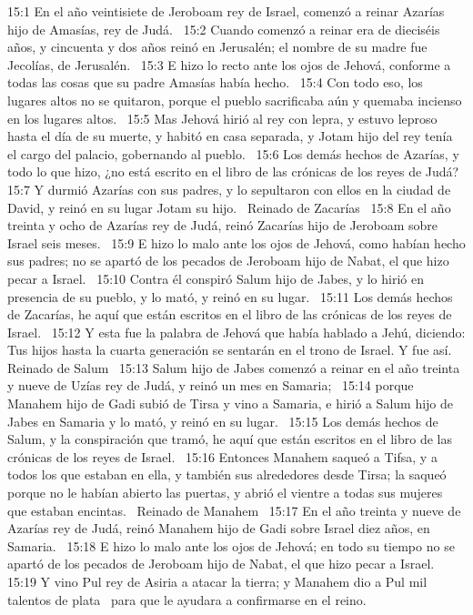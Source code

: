 15:1 En el año veintisiete de Jeroboam rey de Israel, comenzó a reinar Azarías hijo de Amasías, rey de Judá.  
15:2 Cuando comenzó a reinar era de dieciséis años, y cincuenta y dos años reinó en Jerusalén; el nombre de su madre fue Jecolías, de Jerusalén.  
15:3 E hizo lo recto ante los ojos de Jehová, conforme a todas las cosas que su padre Amasías había hecho.  
15:4 Con todo eso, los lugares altos no se quitaron, porque el pueblo sacrificaba aún y quemaba incienso en los lugares altos.  
15:5 Mas Jehová hirió al rey con lepra, y estuvo leproso hasta el día de su muerte, y habitó en casa separada, y Jotam hijo del rey tenía el cargo del palacio, gobernando al pueblo.  
15:6 Los demás hechos de Azarías, y todo lo que hizo, ¿no está escrito en el libro de las crónicas de los reyes de Judá?  
15:7 Y durmió Azarías con sus padres, y lo sepultaron con ellos en la ciudad de David, y reinó en su lugar Jotam su hijo.  
Reinado de Zacarías  
15:8 En el año treinta y ocho de Azarías rey de Judá, reinó Zacarías hijo de Jeroboam sobre Israel seis meses.  
15:9 E hizo lo malo ante los ojos de Jehová, como habían hecho sus padres; no se apartó de los pecados de Jeroboam hijo de Nabat, el que hizo pecar a Israel.  
15:10 Contra él conspiró Salum hijo de Jabes, y lo hirió en presencia de su pueblo, y lo mató, y reinó en su lugar.  
15:11 Los demás hechos de Zacarías, he aquí que están escritos en el libro de las crónicas de los reyes de Israel.  
15:12 Y esta fue la palabra de Jehová que había hablado a Jehú, diciendo: Tus hijos hasta la cuarta generación se sentarán en el trono de Israel. Y fue así.  
Reinado de Salum  
15:13 Salum hijo de Jabes comenzó a reinar en el año treinta y nueve de Uzías rey de Judá, y reinó un mes en Samaria;  
15:14 porque Manahem hijo de Gadi subió de Tirsa y vino a Samaria, e hirió a Salum hijo de Jabes en Samaria y lo mató, y reinó en su lugar.  
15:15 Los demás hechos de Salum, y la conspiración que tramó, he aquí que están escritos en el libro de las crónicas de los reyes de Israel.  
15:16 Entonces Manahem saqueó a Tifsa, y a todos los que estaban en ella, y también sus alrededores desde Tirsa; la saqueó porque no le habían abierto las puertas, y abrió el vientre a todas sus mujeres que estaban encintas.  
Reinado de Manahem  
15:17 En el año treinta y nueve de Azarías rey de Judá, reinó Manahem hijo de Gadi sobre Israel diez años, en Samaria.  
15:18 E hizo lo malo ante los ojos de Jehová; en todo su tiempo no se apartó de los pecados de Jeroboam hijo de Nabat, el que hizo pecar a Israel.  
15:19 Y vino Pul rey de Asiria a atacar la tierra; y Manahem dio a Pul mil talentos de plata  para que le ayudara a confirmarse en el reino.  
